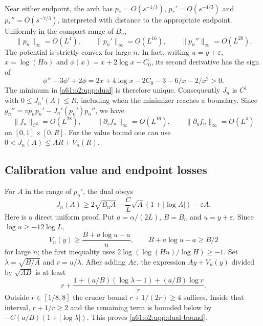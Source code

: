 \documentclass[11pt,letterpaper]{article}
\numberwithin{equation}{section}
\theoremstyle{remark}\newtheorem{remark}[theorem]{Remark}
\begin{document}
Near either endpoint, the arch has $p_*=O(s^{-1/3})$, $p_*'=O(s^{-4/3})$ and $p_*''=O(s^{-7/3})$, interpreted with distance to the appropriate endpoint. Uniformly in the compact range of $B_n$,
\begin{equation}\label{a61:o2:upp:derivatives}
 \|p_n\|_\infty=O(L^4),\qquad
 \|p_n'\|_\infty=O(L^{16}),\qquad
 \|p_n''\|_\infty=O(L^{28}).
\end{equation}
The potential is strictly convex for large $n$. In fact, writing $u=y+\varepsilon$, $x=\log(Hu)$ and $\phi(x)=x+2\log x-C_0$, its second derivative has the sign of
\[
 \phi''-3\phi'+2\phi
 =2x+4\log x-2C_0-3-6/x-2/x^2>0.
\]
The minimum in \eqref{a61:o2:upp:dual} is therefore unique. Consequently $J_n$ is $C^1$ with $0\le J_n'(A)\le R$, including when the minimizer reaches a boundary. Since
$g_n''=vp_np_n'-J_n'(p_n')p_n''$, we have
\begin{equation}\label{a61:o2:upp:Ctwo}
 \|f_n\|_{C^2}=O(L^{28}),\qquad
 \|\partial_s f_n\|_\infty=O(L^{16}),\qquad
 \|\partial_y f_n\|_\infty=O(L^4)
\end{equation}
on $[0,1]\times[0,R]$. For the value bound one can use $0<J_n(A)\le AR+V_n(R)$.

\subsection{Calibration value and endpoint losses}
For $A$ in the range of $p_n'$, the dual obeys
\begin{equation}\label{a61:o2:upp:dual-bound}
 J_n(A)\ge2\sqrt{B_nA}
 -\frac CL\sqrt A(1+|\log A|)-\varepsilon A.
\end{equation}
Here is a direct uniform proof. Put $a=\alpha/(2L)$, $B=B_n$ and $u=y+\varepsilon$. Since $\log u\ge-12\log L$,
\[
 V_n(y)\ge\frac{B+a\log u-a}{u},\qquad
 B+a\log u-a\ge B/2
\]
for large $n$; the first inequality uses
$2\log(\log(Hu)/\log H)\ge-1$. Set $\lambda=\sqrt{B/A}$ and $r=u/\lambda$. After adding $A\varepsilon$, the expression $Ay+V_n(y)$ divided by $\sqrt{AB}$ is at least
\[
 r+\frac{1+(a/B)(\log\lambda-1)+(a/B)\log r}{r}.
\]
Outside $r\in[1/8,8]$ the cruder bound $r+1/(2r)\ge4$ suffices. Inside that interval, $r+1/r\ge2$ and the remaining term is bounded below by
$-C(a/B)(1+|\log\lambda|)$. This proves \eqref{a61:o2:upp:dual-bound}.
\end{document}
